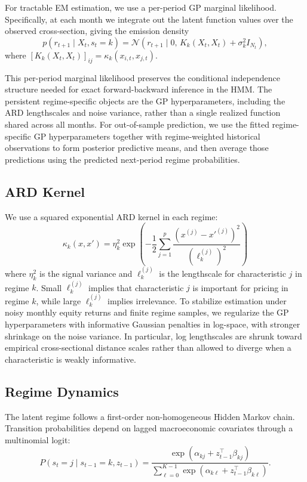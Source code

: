 \documentclass[11pt]{article}
\begin{document}
For tractable EM estimation, we use a per-period GP marginal likelihood. Specifically, at each month we integrate out the latent function values over the observed cross-section, giving the emission density
\[
p(r_{t+1} \mid X_t, s_t=k)
=
\mathcal{N}\!\left(
r_{t+1}
\mid
0,\,
K_k(X_t,X_t)+\sigma_k^2 I_{N_t}
\right),
\]
where \([K_k(X_t,X_t)]_{ij}=\kappa_k(x_{i,t},x_{j,t})\).

This per-period marginal likelihood preserves the conditional independence structure needed for exact forward-backward inference in the HMM. The persistent regime-specific objects are the GP hyperparameters, including the ARD lengthscales and noise variance, rather than a single realized function shared across all months. For out-of-sample prediction, we use the fitted regime-specific GP hyperparameters together with regime-weighted historical observations to form posterior predictive means, and then average those predictions using the predicted next-period regime probabilities.

\subsection{ARD Kernel}
We use a squared exponential ARD kernel in each regime:
$$\kappa_k(x, x') = \eta_k^2 \exp\!\left(-\frac{1}{2} \sum_{j=1}^{p} \frac{(x^{(j)} - x'^{(j)})^2}{(\ell_k^{(j)})^2}\right)$$
where $\eta_k^2$ is the signal variance and $\ell_k^{(j)}$ is the lengthscale for characteristic $j$ in regime $k$. Small $\ell_k^{(j)}$ implies that characteristic $j$ is important for pricing in regime $k$, while large $\ell_k^{(j)}$ implies irrelevance. To stabilize estimation under noisy monthly equity returns and finite regime samples, we regularize the GP hyperparameters with informative Gaussian penalties in log-space, with stronger shrinkage on the noise variance. In particular, log lengthscales are shrunk toward empirical cross-sectional distance scales rather than allowed to diverge when a characteristic is weakly informative.

\subsection{Regime Dynamics}
The latent regime follows a first-order non-homogeneous Hidden Markov chain. Transition probabilities depend on lagged macroeconomic covariates through a multinomial logit:
\[
P(s_t=j \mid s_{t-1}=k,z_{t-1})
=
\frac{
\exp(\alpha_{kj}+z_{t-1}^\top \beta_{kj})
}{
\sum_{\ell=0}^{K-1}
\exp(\alpha_{k\ell}+z_{t-1}^\top \beta_{k\ell})
}.
\]
\end{document}
